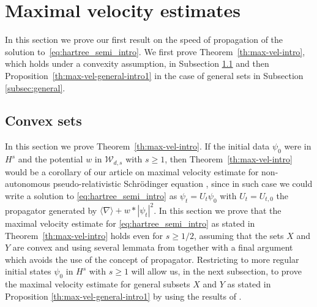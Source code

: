 \documentclass[12pt]{article}
\theoremstyle{plain}
\begin{document}
	
	
	
	
	
	
\section{Maximal velocity estimates }\label{sec:max-vel}

In this section we prove our first result on the speed of propagation of the solution to~\eqref{eq:hartree_semi_intro}. We first prove Theorem~\ref{th:max-vel-intro}, which holds under a convexity assumption, in Subsection \ref{subsec:convex} and then Proposition~\ref{th:max-vel-general-intro1} in the case of general sets in Subsection \ref{subsec:general}.


\subsection{Convex sets}\label{subsec:convex}
%
In this section we prove Theorem~\ref{th:max-vel-intro}. If the initial data $\psi_0$ were in $H^s$ and the potential $w$ in $\mathcal{W}_{d,s}$ with $s\geq 1$, then Theorem~\ref{th:max-vel-intro} would be a corollary of our article on maximal velocity estimate for non-autonomous pseudo-relativistic Schrödinger equation \cite{BFG2a}, since in such case we could write a solution to \eqref{eq:hartree_semi_intro} as $\psi_t=U_t\psi_0$ with $U_t=U_{t,0}$ the propagator generated by $\langle\nabla\rangle+w*|\psi_t|^2$. In this section we prove that the maximal velocity estimate for \eqref{eq:hartree_semi_intro} as stated in Theorem~\ref{th:max-vel-intro} holds even for $s\geq 1/2$, assuming that the sets $X$ and $Y$ are convex and using several lemmata from  \cite{BFG2a} together with a final argument which avoids the use of the concept of propagator. 
Restricting to more regular initial states $\psi_0$ in $H^s$ with $s\geq1$ will allow us, in the next subsection, to prove the maximal velocity estimate for general subsets $X$ and $Y$ as stated in Proposition \ref{th:max-vel-general-intro1} by using the results of \cite{BFG2a}.
\end{document}
